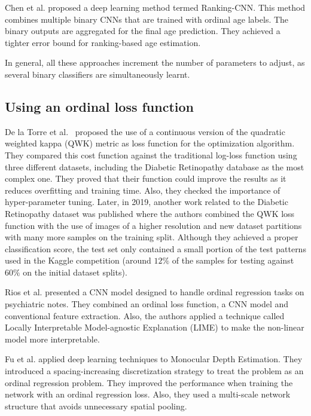 \documentclass[preprint]{elsarticle}
\begin{document}
Chen et al. \cite{chen2017using} proposed a deep learning method termed Ranking-CNN. This method combines multiple binary CNNs that are trained with ordinal age labels. The binary outputs are aggregated for the final age prediction. They achieved a tighter error bound for ranking-based age estimation.

In general, all these approaches increment the number of parameters to adjust, as several binary classifiers are simultaneously learnt.


\subsection{Using an ordinal loss function}

De la Torre et al.~\cite{de2018weighted} proposed the use of a continuous version of the quadratic weighted kappa (QWK) metric as loss function for the optimization algorithm. They compared this cost function against the traditional log-loss function using three different datasets, including the Diabetic Retinopathy database as the most complex one. They proved that their function could improve the results as it reduces overfitting and training time. Also, they checked the importance of hyper-parameter tuning. Later, in 2019, another work related to the Diabetic Retinopathy dataset was published \cite{de2019deep} where the authors combined the QWK loss function with the use of images of a higher resolution and new dataset partitions with many more samples on the training split. Although they achieved a proper classification score, the test set only contained a small portion of the test patterns used in the Kaggle competition (around $12\%$ of the samples for testing against $60\%$ on the initial dataset splits).

Rios et al. \cite{rios2017ordinal} presented a CNN model designed to handle ordinal regression tasks on psychiatric notes. They combined an ordinal loss function, a CNN model and conventional feature extraction. Also, the authors applied a technique called Locally Interpretable Model-agnostic Explanation (LIME) to make the non-linear model more interpretable.

Fu et al. \cite{fu2018deep} applied deep learning techniques to Monocular Depth Estimation. They introduced a spacing-increasing discretization strategy to treat the problem as an ordinal regression problem. They improved the performance when training the network with an ordinal regression loss. Also, they used a multi-scale network structure that avoids unnecessary spatial pooling.
\end{document}
